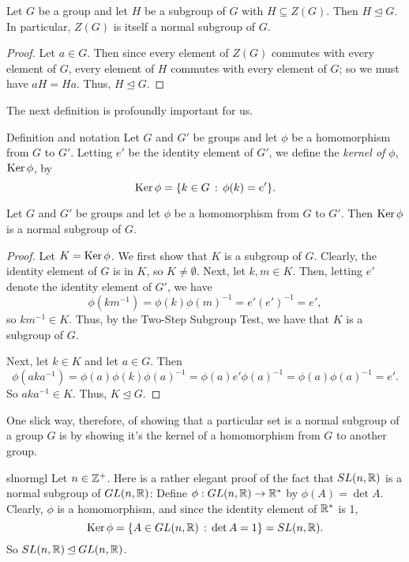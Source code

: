 \begin{thm}\label{znorm}Let $G$ be a group and let $H$ be a subgroup of $G$ with $H\subseteq Z(G)$. Then $H\unlhd G$. In particular, $Z(G)$ is itself a normal
subgroup of $G$.\end{thm}

\begin{proof} Let $a\in G$.
Then since every element of $Z(G)$ commutes with every element of
$G$, every element of $H$ commutes with every element of $G$; so we must have $aH=Ha$.  Thus,
$H\unlhd G$. \end{proof}

 The next definition is profoundly important for us.

\begin{df}{Definition and notation} Let $G$ and $G'$ be groups and let $\phi$ be a
homomorphism from $G$ to $G'$. Letting $e'$ be the identity
element of $G'$, we define the \textit{kernel of $\phi$}, $\operatorname{Ker}
\phi$, by
$$\operatorname{Ker} \phi = \{k\in G\,:\,\phi(k)=e'\}.$$\end{df}

 \begin{example}{} Let $G$ and $G'$ be groups and let $\phi$ be a
homomorphism from $G$ to $G'$. Then $\operatorname{Ker} \phi$ is a normal subgroup
of $G$.

\begin{proof} Let $K=\operatorname{Ker} \phi$.  We first show that $K$ is a subgroup of
$G$. Clearly, the identity element of $G$ is in $K$, so $K\neq
\emptyset$. Next, let $k,m\in K$.  Then, letting $e'$ denote the
identity element of $G'$, we have
$$\phi(km^{-1})=\phi(k)\phi(m)^{-1}=e'(e')^{-1}=e',$$ so $km^{-1}\in
K$.  Thus, by the Two-Step Subgroup Test, we have that $K$ is a
subgroup of $G$.

Next, let $k\in K$ and let $a\in G$. Then
$$\phi(aka^{-1})=\phi(a)\phi(k)\phi(a)^{-1}=\phi(a)e'\phi(a)^{-1}=\phi(a)\phi(a)^{-1}=e'.$$
So $aka^{-1}\in K$. Thus, $K \unlhd G$.\end{proof} \end{example}

One slick way, therefore, of showing that a particular set is a
normal subgroup of a group $G$ is by showing it's the kernel of a
homomorphism from $G$ to another group.

\begin{example}{slnormgl} Let $n\in \mathbb{Z}^+$. Here is a rather elegant proof of the fact that
$SL(n,\mathbb{R})$ is a normal subgroup of $GL(n,\mathbb{R})$:  Define $\phi:
GL(n,\mathbb{R}) \to \mathbb{R}^*$ by $\phi(A)=\det A$.  Clearly, $\phi$ is a
homomorphism, and since the identity element of $\mathbb{R}^*$ is 1,
$$\operatorname{Ker} \phi=\{A\in GL(n,\mathbb{R})\,:\,\det A= 1\}=SL(n,\mathbb{R}).$$ So
$SL(n,\mathbb{R})\unlhd GL(n,\mathbb{R})$.
\end{example}


